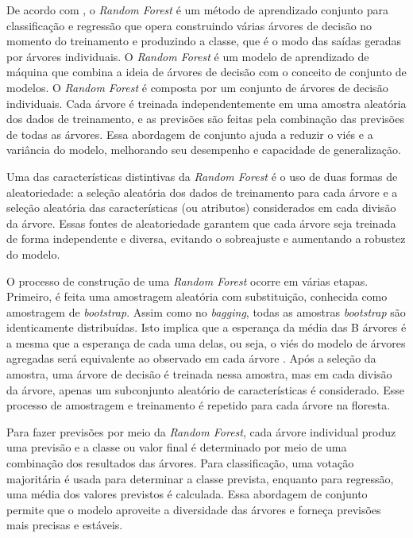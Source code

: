 \documentclass[12pt,oneside,a4paper,chapter=TITLE,
			   english,brazil]{abntex2}
\begin{document}
\vspace{\onelineskip}

De acordo  com ,   o \textit{Random Forest} é um método de aprendizado conjunto para classificação e regressão que opera construindo várias árvores de decisão no momento do
treinamento e produzindo a classe, que é o modo das saídas geradas por árvores individuais. O \textit{Random Forest} é um modelo de aprendizado de máquina que combina a ideia de árvores de decisão com o conceito de conjunto de modelos. O \textit{Random Forest} é composta por um conjunto de árvores de decisão individuais. Cada árvore é treinada independentemente em uma amostra aleatória dos dados de treinamento, e as previsões são feitas pela combinação das previsões de todas as árvores. Essa abordagem de conjunto ajuda a reduzir o viés e a variância do modelo, melhorando seu desempenho e capacidade de generalização.

Uma das características distintivas da \textit{Random Forest} é o uso de duas formas de aleatoriedade: a seleção aleatória dos dados de treinamento para cada árvore e a seleção aleatória das características (ou atributos) considerados em cada divisão da árvore. Essas fontes de aleatoriedade garantem que cada árvore seja treinada de forma independente e diversa, evitando o sobreajuste e aumentando a robustez do modelo.

O processo de construção de uma \textit{Random Forest} ocorre em várias etapas. Primeiro, é feita uma amostragem aleatória com substituição, conhecida como amostragem de \textit{bootstrap}. Assim como no \textit{bagging}, todas as amostras \textit{bootstrap} são identicamente distribuídas.
Isto implica que a esperança da média das B árvores é a mesma que a esperança de cada
uma delas, ou seja, o viés do modelo de árvores agregadas será equivalente ao observado
em cada árvore \cite{faelforest}. Após a seleção da amostra, uma árvore de decisão é treinada nessa amostra, mas em cada divisão da árvore, apenas um subconjunto aleatório de características é considerado. Esse processo de amostragem e treinamento é repetido para cada árvore na floresta.

Para fazer previsões por meio da \textit{Random Forest}, cada árvore individual produz uma previsão e a classe ou valor final é determinado por meio de uma combinação dos resultados das árvores. Para classificação, uma votação majoritária é usada para determinar a classe prevista, enquanto para regressão, uma média dos valores previstos é calculada. Essa abordagem de conjunto permite que o modelo aproveite a diversidade das árvores e forneça previsões mais precisas e estáveis.
\end{document}
